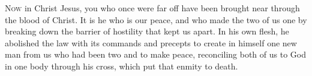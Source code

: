 
\lettrine{N}{ow} in Christ Jesus, you who once were far off have been brought near through the blood of Christ. It is he who is our peace, and who made the two of us one by breaking down the barrier of hostility that kept us apart. In his own flesh, he abolished the law with its commands and precepts to create in himself one new man from us who had been two and to make peace, reconciling both of us to God in one body through his cross, which put that enmity to death.